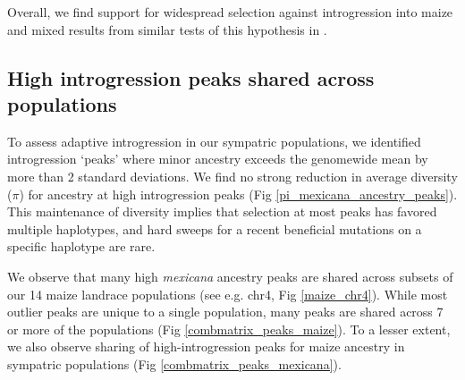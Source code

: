 Overall, we find support for widespread selection against introgression into maize and mixed results from similar tests of this hypothesis in \mexicana.

\subsection*{High introgression peaks shared across populations}

To assess adaptive introgression in our sympatric populations, we identified introgression ‘peaks' where minor ancestry exceeds the genomewide mean by more than 2 standard deviations. We find no strong reduction in average diversity ($\pi$) for \mexicana ancestry at high introgression peaks (Fig \ref{pi_mexicana_ancestry_peaks}). 
This maintenance of diversity implies that selection at most peaks has favored multiple \mexicana haplotypes, and hard sweeps for a recent beneficial mutations on a specific haplotype are rare.

We observe that many high \textit{mexicana} ancestry peaks are shared across subsets of our 14 maize landrace populations (see e.g. chr4, Fig \ref{maize_chr4}). 
While most outlier peaks are unique to a single population, many peaks are shared across 7 or more of the populations (Fig \ref{combmatrix_peaks_maize}).
To a lesser extent, we also observe sharing of high-introgression peaks for maize ancestry in sympatric \mexicana populations (Fig \ref{combmatrix_peaks_mexicana}).


